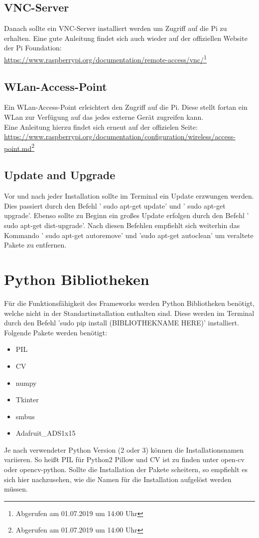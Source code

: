 \documentclass[a4paper,cleardoubleempty,BCOR1cm]{book}
\begin{document}
\subsection{VNC-Server}
Danach sollte ein VNC-Server installiert werden um Zugriff auf die Pi zu erhalten. Eine gute Anleitung findet sich auch wieder auf der offiziellen Website der Pi Foundation:\\
\url{https://www.raspberrypi.org/documentation/remote-access/vnc/}\footnote{Abgerufen am 01.07.2019 um 14:00 Uhr}


\subsection{WLan-Access-Point}
Ein WLan-Access-Point erleichtert den Zugriff auf die Pi. Diese stellt fortan ein WLan zur Verfügung auf das jedes externe Gerät zugreifen kann. \\
Eine Anleitung hierzu findet sich erneut auf der offizielen Seite:\\
\url{https://www.raspberrypi.org/documentation/configuration/wireless/access-point.md}\footnote{Abgerufen am 01.07.2019 um 14:00 Uhr}

\subsection{Update and Upgrade}
Vor und nach jeder Installation sollte im Terminal ein Update erzwungen werden. Dies passiert durch den Befehl ' sudo apt-get update' und ' sudo apt-get upgrade'. Ebenso sollte zu Beginn ein großes Update erfolgen durch den Befehl ' sudo apt-get dist-upgrade'. Nach diesen Befehlen empfiehlt sich weiterhin das Kommando ' sudo apt-get autoremove' und 'sudo apt-get autoclean' um veraltete Pakete zu entfernen. 

\section{Python Bibliotheken}

Für die Funktionsfähigkeit des Frameworks werden Python Bibliotheken benötigt, welche nicht in der Standartinstallation enthalten sind. Diese werden im Terminal durch den Befehl 'sudo pip install (BIBLIOTHEKNAME HERE)' installiert.\\
Folgende Pakete werden benötigt: 
\begin{center}
	\begin{itemize}
		\item PIL
		\item CV
		\item numpy
		\item Tkinter
		\item smbus
		\item Adafruit\_ADS1x15
	\end{itemize}
\end{center}
Je nach verwendeter Python Version (2 oder 3) können die Installationsnamen variieren. So heißt PIL für Python2 Pillow und CV ist zu finden unter open-cv oder opencv-python. Sollte die Installation der Pakete scheitern, so empfiehlt es sich hier nachzusehen, wie die Namen für die Installation aufgelöst werden müssen. 
\end{document}
